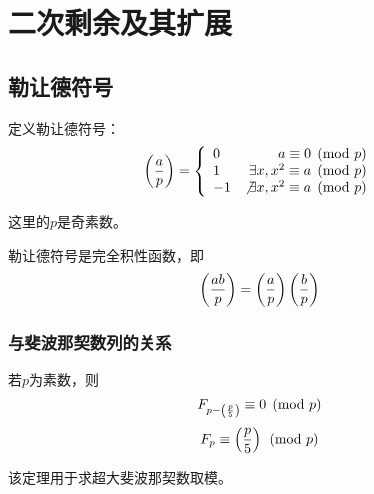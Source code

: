 \section{二次剩余及其扩展}
\subsection{勒让德符号}\label{Legendre}
定义勒让德符号：
\begin{displaymath}
	\left(\frac{a}{p}\right)=
	\left\{\begin{array}{lr}
		0  & a\equiv 0 \pmod{p}                  \\
		1  & \exists x,x^2\equiv a \pmod{p}      \\
		-1 & \not \exists x,x^2\equiv a \pmod{p}
	\end{array}\right.
\end{displaymath}

这里的$p$是奇素数。

勒让德符号是完全积性函数，即
\begin{displaymath}
	\left(\frac{ab}{p}\right)=\left(\frac{a}{p}\right)\left(\frac{b}{p}\right)
\end{displaymath}
\subsubsection{与斐波那契数列的关系}
\begin{theorem}
	若$p$为素数，则
	\begin{displaymath}
		F_{p-\left(\frac{p}{5}\right)}\equiv 0 \pmod{p}
	\end{displaymath}
	\begin{displaymath}
		F_p\equiv \left(\frac{p}{5}\right) \pmod{p}
	\end{displaymath}
\end{theorem}
该定理用于求超大斐波那契数取模。
